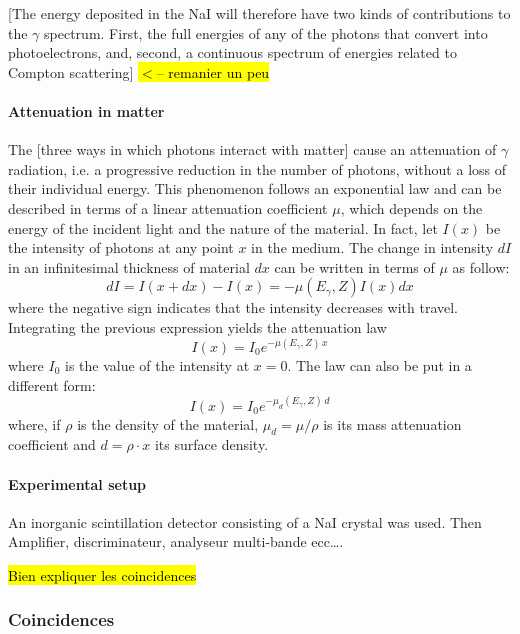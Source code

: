 [The energy deposited in the NaI will therefore have two kinds of contributions to the $\gamma$ spectrum.
First, the full energies of any of the photons that convert into photoelectrons, and, second, a continuous spectrum of energies related to Compton scattering] \hl{$<$-- remanier un peu}

\paragraph{Attenuation in matter}
The [three ways in which photons interact with matter] cause an attenuation of $\gamma$ radiation, i.e. a progressive reduction in the number of photons, without a loss of their individual energy.
This phenomenon follows an exponential law and can be described in terms of a linear attenuation coefficient $\mu$, which depends on the energy of the incident light and the nature of the material.
In fact, let $I(x)$ be the intensity of photons at any point $x$ in the medium.
The change in intensity $dI$ in an infinitesimal thickness of material $dx$ can be written in terms of $\mu$ as follow:
\begin{equation}
    dI = I(x + dx) - I(x) = -\mu(E_{\gamma}, Z) I(x) dx
\end{equation}
where the negative sign indicates that the intensity decreases with travel.
Integrating the previous expression yields the attenuation law
\begin{equation} \label{eq:attenuation_law}
    I(x) = I_0 e^{-\mu(E_{\gamma}, Z) \, x}
\end{equation}
where $I_0$ is the value of the intensity at $x=0$. 
The law can also be put in a different form:
\begin{equation} \label{eq:attenuation_law_density}
    I(x) = I_0 e^{-\mu_d(E_{\gamma}, Z) \, d}
\end{equation}
where, if $\rho$ is the density of the material, $\mu_d = \mu / \rho$ is its mass attenuation coefficient and $d = \rho \cdot x$ its surface density.

\paragraph{Experimental setup}
An inorganic scintillation detector consisting of a NaI crystal was used.
Then Amplifier, discriminateur, analyseur  multi-bande ecc\dots.

\hl{Bien expliquer les coincidences}

\subsubsection{Coincidences}

